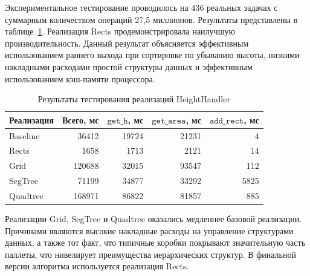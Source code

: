 \begin{table}[H]
\centering
\caption{Сравнение вычислительной сложности реализаций HeightHandler}
\label{tab:evyukh_complexity}
\end{table}

Экспериментальное тестирование проводилось на 436 реальных задачах с суммарным количеством операций 27,5 миллионов. Результаты представлены в таблице~\ref{tab:evyukh_heighthandler}. Реализация Rects продемонстрировала наилучшую производительность. Данный результат объясняется эффективным использованием раннего выхода при сортировке по убыванию высоты, низкими накладными расходами простой структуры данных и эффективным использованием кэш-памяти процессора.

\begin{table}[H]
\centering
\caption{Результаты тестирования реализаций HeightHandler}
\label{tab:evyukh_heighthandler}
\begin{tabular}{|l|r|r|r|r|}
\hline
\textbf{Реализация} & \textbf{Всего, мс} & $\mathtt{get\_h}$, мс & $\mathtt{get\_area}$, мс & $\mathtt{add\_rect}$, мс \\
\hline
Baseline & 36412 & 19724 & 21231 & 4 \\
Rects & 1658 & 1713 & 2121 & 14 \\
Grid & 120688 & 32015 & 93547 & 112 \\
SegTree & 71199 & 34877 & 33292 & 5825 \\
Quadtree & 168971 & 86822 & 81857 & 885 \\
\hline
\end{tabular}
\end{table}

Реализации Grid, SegTree и Quadtree оказались медленнее базовой реализации. Причинами являются высокие накладные расходы на управление структурами данных, а также тот факт, что типичные коробки покрывают значительную часть паллеты, что нивелирует преимущества иерархических структур. В финальной версии алгоритма используется реализация Rects.

